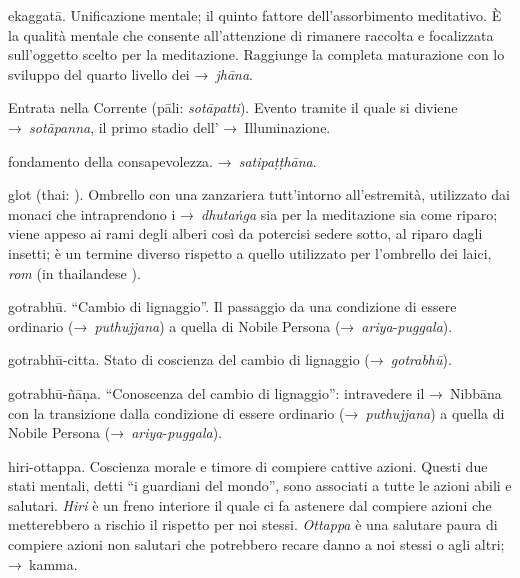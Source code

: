 \begin{glossarydescription}

\item[ekaggatā.] Unificazione mentale; il quinto fattore dell'assorbimento
  meditativo. È la qualità mentale che consente all'attenzione di rimanere
  raccolta e focalizzata sull'oggetto scelto per la meditazione. Raggiunge la
  completa maturazione con lo sviluppo del quarto livello dei →~\emph{jhāna}.

\item[Entrata nella Corrente] (pāli: \emph{sotāpatti}). Evento tramite il quale
  si diviene →~\emph{sotāpanna}, il primo stadio dell' →~Illuminazione.


\item[fondamento della consapevolezza.] →~\emph{satipaṭṭhāna}.


\item[glot] (thai: ). Ombrello con una zanzariera tutt'intorno
  all'estremità, utilizzato dai monaci che intraprendono i →~\emph{dhutaṅga} sia
  per la meditazione sia come riparo; viene appeso ai rami degli alberi così da
  potercisi sedere sotto, al riparo dagli insetti; è un termine diverso rispetto
  a quello utilizzato per l'ombrello dei laici, \emph{rom} (in thailandese
  ).

\item[gotrabhū.] ``Cambio di lignaggio''. Il passaggio da una condizione
  di essere ordinario (→~\emph{puthujjana}) a quella di Nobile Persona
  (→~\emph{ariya}-\emph{puggala}).

\item[gotrabhū-citta.] Stato di coscienza del cambio di lignaggio
  (→~\emph{gotrabhū}).

\item[gotrabhū-ñāṇa.] ``Conoscenza del cambio di lignaggio'': intravedere
  il →~Nibbāna con la transizione dalla condizione di essere ordinario
  (→~\emph{puthujjana}) a quella di Nobile Persona
  (→~\emph{ariya}-\emph{puggala}).


\item[hiri-ottappa.] Coscienza morale e timore di compiere cattive azioni.
  Questi due stati mentali, detti ``i guardiani del mondo'', sono associati a
  tutte le azioni abili e salutari. \emph{Hiri} è un freno interiore il quale ci
  fa astenere dal compiere azioni che metterebbero a rischio il rispetto per noi
  stessi. \emph{Ottappa} è una salutare paura di compiere azioni non salutari
  che potrebbero recare danno a noi stessi o agli altri; →~kamma.


\end{glossarydescription}
